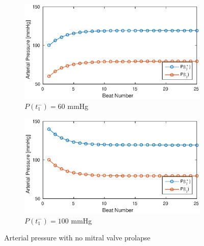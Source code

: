 \documentclass{article}
\begin{document}
\begin{figure}[H]
\centering
\begin{subfigure}{0.6\textwidth}
	\includegraphics[width=\textwidth]{figures/P_A60.eps}
	\caption{$P(t_1^-) = 60$ mmHg}
\end{subfigure}

\vspace{20pt}
\begin{subfigure}{0.6\textwidth}
	\includegraphics[width=\textwidth]{figures/P_A100.eps}
	\caption{$P(t_1^-) = 100$ mmHg}
\end{subfigure}
\caption{Arterial pressure with no mitral valve prolapse}
\end{figure}
\end{document}
